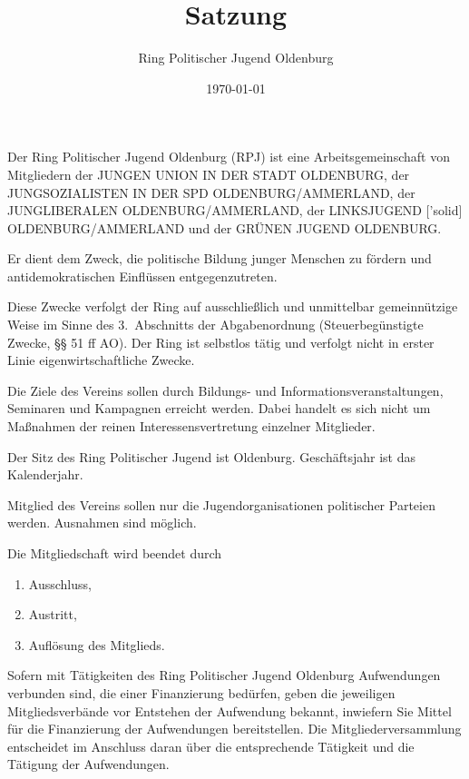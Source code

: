 \documentclass[10pt,a4paper,oneside,parskip=half]{scrartcl}
\title{Satzung}
\date{\today}
\author{Ring Politischer Jugend Oldenburg}
\begin{document}
\maketitle

\begin{contract}

Der Ring Politischer Jugend Oldenburg (RPJ) ist eine Arbeitsgemeinschaft von Mitgliedern der JUNGEN UNION IN DER STADT OLDENBURG, der JUNGSOZIALISTEN IN DER SPD OLDENBURG/AMMERLAND, der JUNGLIBERALEN OLDENBURG/AMMERLAND, der LINKSJUGEND ['solid] OLDENBURG/AMMERLAND und der GRÜNEN JUGEND OLDENBURG.

Er dient dem Zweck, die politische Bildung junger Menschen zu fördern und antidemokratischen Einflüssen entgegenzutreten.

Diese Zwecke verfolgt der Ring auf ausschließlich und unmittelbar gemeinnützige Weise im Sinne des 3.~Abschnitts der Abgabenordnung (Steuerbegünstigte Zwecke, §§ 51 ff AO). Der Ring ist selbstlos tätig und verfolgt nicht in erster Linie eigenwirtschaftliche Zwecke.

Die Ziele des Vereins sollen durch Bildungs- und Informationsveranstaltungen, Seminaren und Kampagnen erreicht werden. Dabei handelt es sich nicht um Maßnahmen der reinen Interessensvertretung einzelner Mitglieder.

Der Sitz des Ring Politischer Jugend ist Oldenburg. Geschäftsjahr ist das Kalenderjahr.

Mitglied des Vereins sollen nur die Jugendorganisationen politischer Parteien werden. Ausnahmen sind möglich.

Die Mitgliedschaft wird beendet durch
\begin{enumerate}
\item Ausschluss,
\item Austritt,
\item Auflösung des Mitglieds.
\end{enumerate}

Sofern mit Tätigkeiten des Ring Politischer Jugend Oldenburg Aufwendungen verbunden sind, die einer Finanzierung bedürfen, geben die jeweiligen Mitgliedsverbände vor Entstehen der Aufwendung bekannt, inwiefern Sie Mittel für die Finanzierung der Aufwendungen bereitstellen. Die Mitgliederversammlung entscheidet im Anschluss daran über die entsprechende Tätigkeit und die Tätigung der Aufwendungen.


\end{contract}
\end{document}
